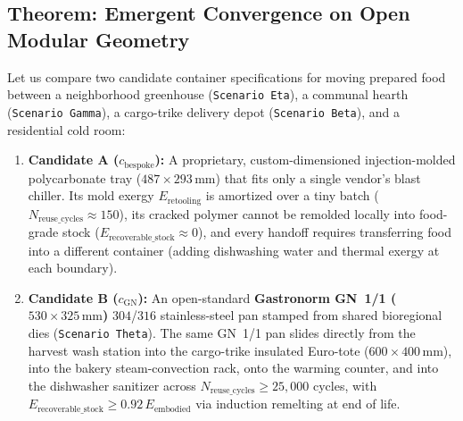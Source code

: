 \subsection{Theorem: Emergent Convergence on Open Modular Geometry}

Let us compare two candidate container specifications for moving prepared food between a neighborhood greenhouse (\texttt{Scenario Eta}), a communal hearth (\texttt{Scenario Gamma}), a cargo-trike delivery depot (\texttt{Scenario Beta}), and a residential cold room:
\begin{enumerate}
    \item \textbf{Candidate A ($c_{\mathrm{bespoke}}$):} A proprietary, custom-dimensioned injection-molded polycarbonate tray ($487 \times 293\,\mathrm{mm}$) that fits only a single vendor's blast chiller. Its mold exergy $E_{\mathrm{retooling}}$ is amortized over a tiny batch ($N_{\mathrm{reuse\_cycles}} \approx 150$), its cracked polymer cannot be remolded locally into food-grade stock ($E_{\mathrm{recoverable\_stock}} \approx 0$), and every handoff requires transferring food into a different container (adding dishwashing water and thermal exergy at each boundary).
    \item \textbf{Candidate B ($c_{\mathrm{GN}}$):} An open-standard \textbf{Gastronorm GN~1/1 ($530 \times 325\,\mathrm{mm}$)} $304$/$316$ stainless-steel pan stamped from shared bioregional dies (\texttt{Scenario Theta}). The same GN~1/1 pan slides directly from the harvest wash station into the cargo-trike insulated Euro-tote ($600 \times 400\,\mathrm{mm}$), into the bakery steam-convection rack, onto the warming counter, and into the dishwasher sanitizer across $N_{\mathrm{reuse\_cycles}} \ge 25{,}000$ cycles, with $E_{\mathrm{recoverable\_stock}} \ge 0.92\,E_{\mathrm{embodied}}$ via induction remelting at end of life.
\end{enumerate}

